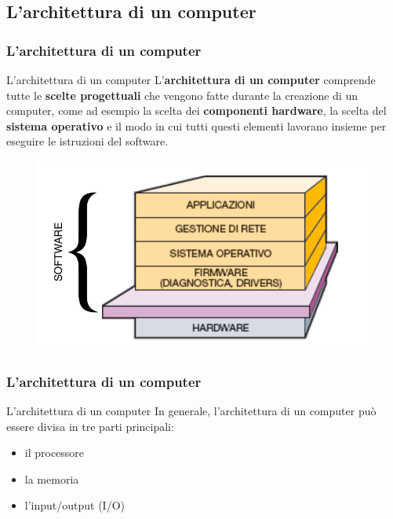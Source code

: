 \subsection[L'architettura di un computer]{L'architettura di un computer}
\begin{frame}
	\frametitle{L'architettura di un computer}
	
	\begin{block}{L'architettura di un computer}
		L'\textbf{architettura di un computer} comprende tutte le \textbf{scelte progettuali} che vengono fatte durante la creazione di un computer, come ad esempio la scelta dei \textbf{componenti hardware}, la scelta del \textbf{sistema operativo} e il modo in cui tutti questi elementi lavorano insieme per eseguire le istruzioni del software.
	\end{block}
	
	\begin{figure}[!htbp]
		\centering 
		\includegraphics[width=0.6\linewidth]{images/2_le_architetture/hd-sw.pdf}
	\end{figure}
	
\end{frame}


\begin{frame}
	\frametitle{L'architettura di un computer}
	
	\begin{block}{L'architettura di un computer}
		In generale, l'architettura di un computer può essere divisa in tre parti principali:
		\begin{itemize}
			\item il processore
			\item la memoria
			\item l'input/output (I/O)
		\end{itemize}
	\end{block}
	
	
\end{frame}


